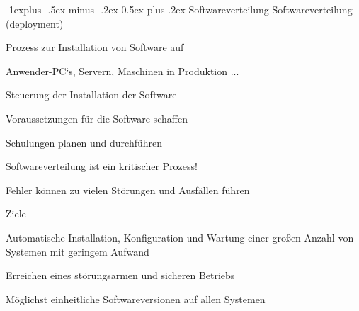 \documentclass[a4paper]{article}
\makeatletter
\renewcommand{\subsection}{\@startsection{subsection}{2}{0mm}%
                                {-1explus -.5ex minus -.2ex}%
                                {0.5ex plus .2ex}%
                                {\normalfont\normalsize\bfseries}}
\makeatother
\begin{document}
\begin{multicols}{3}
  \subsection{Softwareverteilung}
  Softwareverteilung (deployment)
  \begin{itemize*}
    \item Prozess zur Installation von Software auf
    \begin{itemize*}
      \item Anwender-PC‘s, Servern, Maschinen in Produktion ...
    \end{itemize*}
    \item Steuerung der Installation der Software
    \item Voraussetzungen für die Software schaffen
    \begin{itemize*}
      \item Schulungen planen und durchführen
    \end{itemize*}
    \item Softwareverteilung ist ein kritischer Prozess!
    \begin{itemize*}
      \item Fehler können zu vielen Störungen und Ausfällen führen
    \end{itemize*}
    \item Ziele
    \begin{itemize*}
      \item Automatische Installation, Konfiguration und Wartung einer großen Anzahl von Systemen mit geringem Aufwand
      \item Erreichen eines störungsarmen und sicheren Betriebs
      \item Möglichst einheitliche Softwareversionen auf allen Systemen
    \end{itemize*}
  \end{itemize*}


\end{multicols}
\end{document}
